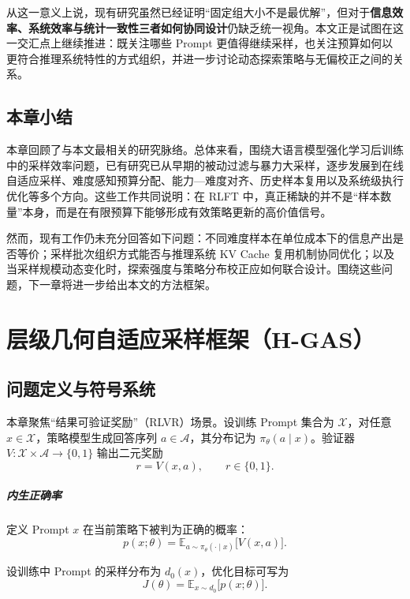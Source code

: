 {从这一意义上说，现有研究虽然已经证明“固定组大小不是最优解”，但对于\textbf{信息效率、系统效率与统计一致性三者如何协同设计}仍缺乏统一视角。本文正是试图在这一交汇点上继续推进：既关注哪些 Prompt 更值得继续采样，也关注预算如何以更符合推理系统特性的方式组织，并进一步讨论动态探索策略与无偏校正之间的关系。

\section{本章小结}

本章回顾了与本文最相关的研究脉络。总体来看，围绕大语言模型强化学习后训练中的采样效率问题，已有研究已从早期的被动过滤与暴力大采样，逐步发展到在线自适应采样、难度感知预算分配、能力—难度对齐、历史样本复用以及系统级执行优化等多个方向。这些工作共同说明：在 RLFT 中，真正稀缺的并不是“样本数量”本身，而是在有限预算下能够形成有效策略更新的高价值信号。

然而，现有工作仍未充分回答如下问题：不同难度样本在单位成本下的信息产出是否等价；采样批次组织方式能否与推理系统 KV Cache 复用机制协同优化；以及当采样规模动态变化时，探索强度与策略分布校正应如何联合设计。围绕这些问题，下一章将进一步给出本文的方法框架。
\chapter{层级几何自适应采样框架（H-GAS）}

\section{问题定义与符号系统}
本章聚焦“结果可验证奖励”（RLVR）场景。设训练 Prompt 集合为 $\mathcal{X}$，对任意 $x\in\mathcal{X}$，策略模型生成回答序列 $a\in\mathcal{A}$，其分布记为 $\pi_{\theta}(a\mid x)$。验证器 $V:\mathcal{X}\times\mathcal{A}\to\{0,1\}$ 输出二元奖励
\begin{equation}
r = V(x,a),\qquad r\in\{0,1\}.
\end{equation}

\paragraph{内生正确率}定义 Prompt $x$ 在当前策略下被判为正确的概率：
\begin{equation}
\label{eq:intrinsic_success}
p(x;\theta)=\mathbb{E}_{a\sim\pi_{\theta}(\cdot\mid x)}\bigl[V(x,a)\bigr].
\end{equation}

设训练中 Prompt 的采样分布为 $d_0(x)$，优化目标可写为
\begin{equation}
\label{eq:objective_px}
J(\theta)=\mathbb{E}_{x\sim d_0}\bigl[p(x;\theta)\bigr].
\end{equation}

}
